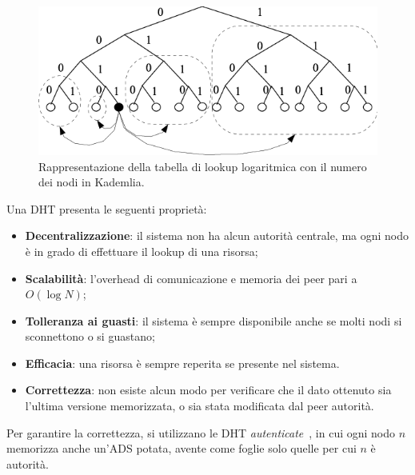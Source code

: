 \begin{figure}
	\centering
	\includegraphics{img/capuno/kademlia.png}
	\caption{Rappresentazione della tabella di lookup logaritmica con il numero dei nodi in Kademlia.}
	\label{fig:mht_proof}
\end{figure}

Una DHT presenta le seguenti proprietà:

\begin{itemize}
	\item[\cmark] \textbf{Decentralizzazione}: il sistema non ha alcun autorità centrale, ma ogni nodo è in grado di effettuare il lookup di una risorsa;
	\item[\cmark] \textbf{Scalabilità}: l'overhead di comunicazione e memoria dei peer pari a $O(\log N)$;
	\item[\cmark] \textbf{Tolleranza ai guasti}: il sistema è sempre disponibile anche se molti nodi si sconnettono o si guastano;
	\item[\cmark] \textbf{Efficacia}: una risorsa è sempre reperita se presente nel sistema.
	\item[\xmark] \textbf{Correttezza}: non esiste alcun modo per verificare che il dato ottenuto sia l'ultima versione memorizzata, o sia stata modificata dal peer autorità.
\end{itemize}

Per garantire la correttezza, si utilizzano le DHT \emph{autenticate}~\cite{tamassia2011efficient, bernardini2019blockchains}, in cui ogni nodo $n$ memorizza anche un'ADS potata, avente come foglie solo quelle per cui $n$ è autorità.
